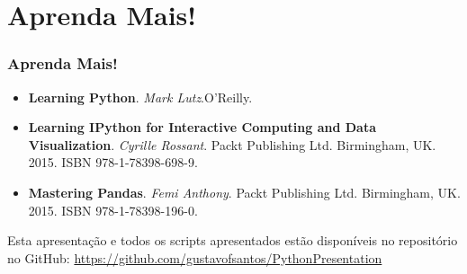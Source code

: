 \documentclass[aspectratio=169]{beamer}
\begin{document}
\section{Aprenda Mais!}

\begin{frame}
	\frametitle{Aprenda Mais!}
	\begin{itemize}
		\item \textbf{Learning Python}. \textit{Mark Lutz}.O'Reilly.
		\item \textbf{Learning IPython for Interactive Computing and Data Visualization}.
\textit{Cyrille Rossant}. Packt Publishing Ltd. Birmingham, UK. 2015. ISBN 978-1-78398-698-9.
		\item \textbf{Mastering Pandas}. \textit{Femi Anthony}. Packt Publishing Ltd.
Birmingham, UK. 2015. ISBN 978-1-78398-196-0.
	\end{itemize}
\end{frame}

\begin{frame}
    Esta apresentação e todos os scripts apresentados estão disponíveis
no repositório no GitHub:
\url{https://github.com/gustavofsantos/PythonPresentation}
\end{frame}

\begin{frame}
\titlepage
\end{frame}
\end{document}
